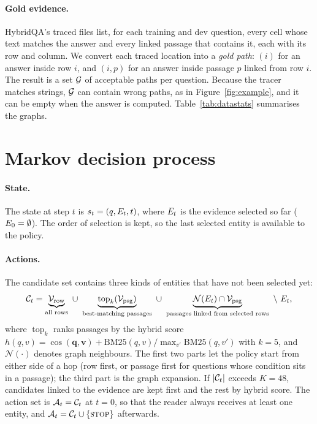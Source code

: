 \paragraph{Gold evidence.} HybridQA's traced files list, for each training and dev question, every cell whose text matches the answer and every linked passage that contains it, each with its row and column. We convert each traced location into a \emph{gold path}: $(i)$ for an answer inside row $i$, and $(i,p)$ for an answer inside passage $p$ linked from row $i$. The result is a set $\mathcal{G}$ of acceptable paths per question. Because the tracer matches strings, $\mathcal{G}$ can contain wrong paths, as in Figure~\ref{fig:example}, and it can be empty when the answer is computed. Table~\ref{tab:datastats} summarises the graphs.



\section{Markov decision process}
\label{sec:mdp}

\paragraph{State.} The state at step $t$ is $s_t=(q,E_t,t)$, where $E_t$ is the evidence selected so far ($E_0=\emptyset$). The order of selection is kept, so the last selected entity is available to the policy.

\paragraph{Actions.} The candidate set contains three kinds of entities that have not been selected yet:
\begin{equation}
  \cand_t=\underbrace{\mathcal{V}_{\mathrm{row}}}_{\text{all rows}}\ \cup\ \underbrace{\operatorname{top}_{k}(\mathcal{V}_{\mathrm{psg}})}_{\text{best-matching passages}}\ \cup\ \underbrace{\mathcal{N}(\evid_t)\cap\mathcal{V}_{\mathrm{psg}}}_{\text{passages linked from selected rows}}\ \setminus\ \evid_t ,
\end{equation}
where $\operatorname{top}_k$ ranks passages by the hybrid score $h(q,v)=\cos(\mathbf{q},\mathbf{v})+\mathrm{BM25}(q,v)/\max_{v'}\mathrm{BM25}(q,v')$ with $k=5$, and $\mathcal{N}(\cdot)$ denotes graph neighbours. The first two parts let the policy start from either side of a hop (row first, or passage first for questions whose condition sits in a passage); the third part is the graph expansion. If $|\mathcal{C}_t|$ exceeds $K=48$, candidates linked to the evidence are kept first and the rest by hybrid score. The action set is $\mathcal{A}_t=\mathcal{C}_t$ at $t=0$, so that the reader always receives at least one entity, and $\mathcal{A}_t=\mathcal{C}_t\cup\{\textsc{stop}\}$ afterwards.

